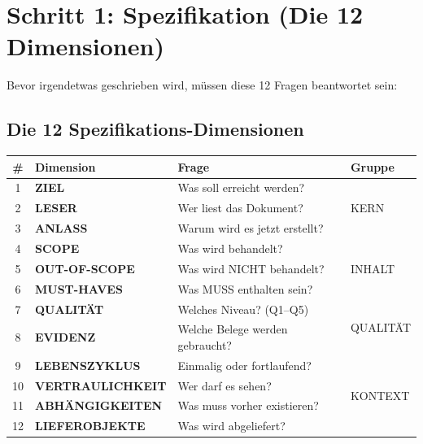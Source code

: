 \documentclass[12pt,a4paper]{article}
\begin{document}
\section{Schritt 1: Spezifikation (Die 12 Dimensionen)}

\begin{tcolorbox}[colback=gray!5!white, colframe=gray!75!black,
    title=\textbf{Schritt 1: Fülle die 12 Dimensionen aus}]

Bevor irgendetwas geschrieben wird, müssen diese 12 Fragen beantwortet sein:

\end{tcolorbox}

\subsection{Die 12 Spezifikations-Dimensionen}

\begin{table}[htbp]
\centering
\renewcommand{\arraystretch}{1.4}
\begin{tabular}{@{}clp{7cm}l@{}}
\toprule
\textbf{\#} & \textbf{Dimension} & \textbf{Frage} & \textbf{Gruppe} \\
\midrule
1 & \textbf{ZIEL} & Was soll erreicht werden? & \multirow{3}{*}{KERN} \\
2 & \textbf{LESER} & Wer liest das Dokument? & \\
3 & \textbf{ANLASS} & Warum wird es jetzt erstellt? & \\
\midrule
4 & \textbf{SCOPE} & Was wird behandelt? & \multirow{3}{*}{INHALT} \\
5 & \textbf{OUT-OF-SCOPE} & Was wird NICHT behandelt? & \\
6 & \textbf{MUST-HAVES} & Was MUSS enthalten sein? & \\
\midrule
7 & \textbf{QUALITÄT} & Welches Niveau? (Q1--Q5) & \multirow{2}{*}{QUALITÄT} \\
8 & \textbf{EVIDENZ} & Welche Belege werden gebraucht? & \\
\midrule
9 & \textbf{LEBENSZYKLUS} & Einmalig oder fortlaufend? & \multirow{4}{*}{KONTEXT} \\
10 & \textbf{VERTRAULICHKEIT} & Wer darf es sehen? & \\
11 & \textbf{ABHÄNGIGKEITEN} & Was muss vorher existieren? & \\
12 & \textbf{LIEFEROBJEKTE} & Was wird abgeliefert? & \\
\bottomrule
\end{tabular}
\end{table}
\end{document}

